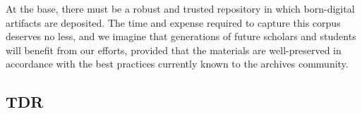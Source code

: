 At the base, there  must be a robust and trusted repository in which born-digital artifacts are deposited. The time and expense required to capture this corpus deserves no less, and we imagine that generations of future scholars and students will benefit from our efforts, provided that the materials are well-preserved in accordance with the best practices currently known to the archives community. 

\subsection{TDR}

